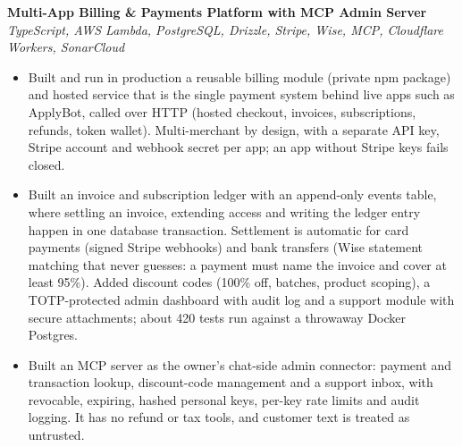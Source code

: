 \documentclass{res} %
\begin{document}
\begin{resume}
  \textbf{Multi-App Billing \& Payments Platform with MCP Admin Server} \\
  {\sl TypeScript, AWS Lambda, PostgreSQL, Drizzle, Stripe, Wise, MCP, Cloudflare Workers, SonarCloud} \smallskip
  \begin{itemize}
    \item Built and run in production a reusable billing module (private npm package) and hosted service that is the single payment system behind live apps such as ApplyBot, called over HTTP (hosted checkout, invoices, subscriptions, refunds, token wallet). Multi-merchant by design, with a separate API key, Stripe account and webhook secret per app; an app without Stripe keys fails closed.
    \item Built an invoice and subscription ledger with an append-only events table, where settling an invoice, extending access and writing the ledger entry happen in one database transaction. Settlement is automatic for card payments (signed Stripe webhooks) and bank transfers (Wise statement matching that never guesses: a payment must name the invoice and cover at least 95\%). Added discount codes (100\% off, batches, product scoping), a TOTP-protected admin dashboard with audit log and a support module with secure attachments; about 420 tests run against a throwaway Docker Postgres.
    \item Built an MCP server as the owner's chat-side admin connector: payment and transaction lookup, discount-code management and a support inbox, with revocable, expiring, hashed personal keys, per-key rate limits and audit logging. It has no refund or tax tools, and customer text is treated as untrusted.
  \end{itemize}
  \vspace{6pt}


\end{resume}
\end{document}
